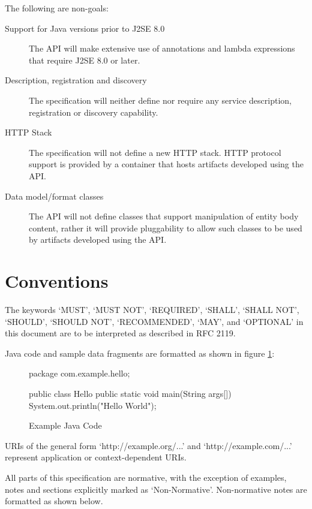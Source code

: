 The following are non-goals:

\begin{description}

\item[Support for Java versions prior to J2SE 8.0] The API will make extensive use of annotations and lambda expressions that require J2SE 8.0 or later.

\item[Description, registration and discovery] The specification will neither define nor require any service description, registration or discovery capability.

\item[HTTP Stack] The specification will not define a new HTTP stack. HTTP protocol support is provided by a container that hosts artifacts developed using the API.

\item[Data model/format classes] The API will not define classes that support manipulation of entity body content, rather it will provide pluggability to allow such classes to be used by artifacts developed using the API.

\end{description}

\section{Conventions}

The keywords `MUST', `MUST NOT', `REQUIRED', `SHALL', `SHALL NOT', `SHOULD', `SHOULD NOT', `RECOMMENDED', `MAY', and `OPTIONAL' in this document are to be interpreted as described in RFC 2119\cite{rfc2119}. 

Java code and sample data fragments are formatted as shown in figure \ref{ex1}:

\begin{figure}[hbtp]
\caption{Example Java Code}
\label{ex1}
\begin{listing}{1}
package com.example.hello;

public class Hello {
    public static void main(String args[]) {
        System.out.println("Hello World");
    }
}\end{listing}
\end{figure}

URIs of the general form `http://example.org/...' and `http://example.com/...' represent application or context-dependent URIs.

All parts of this specification are normative, with the exception of examples, notes and sections explicitly marked as `Non-Normative'. Non-normative notes are formatted as shown below.

